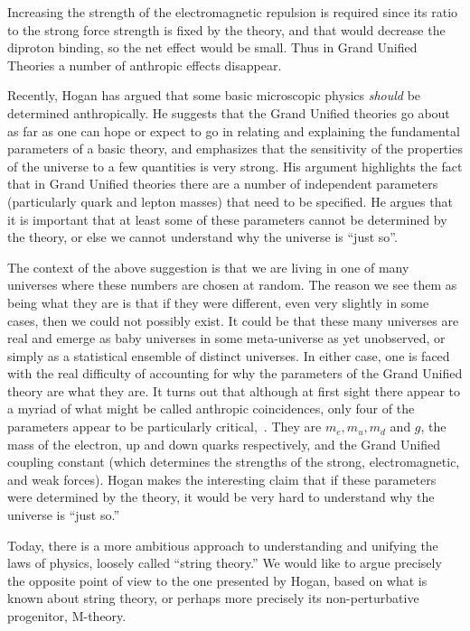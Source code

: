 \documentclass{article}
\begin{document}
Increasing the strength of the electromagnetic
repulsion is required since its ratio to the strong force strength is
fixed by the theory, and that would decrease the diproton binding, so
the net effect would be small. Thus in Grand Unified Theories
a number of anthropic effects disappear.


Recently, Hogan \cite{CH:justso} has argued that some basic microscopic
physics {\it should} be determined anthropically. He suggests that the Grand
Unified theories go about as far as one can hope or expect to go in
relating and explaining the fundamental parameters of a basic theory,
and emphasizes that the sensitivity of the properties of the universe to
a few quantities is very strong. His argument highlights the fact that
in Grand Unified theories there are a number
of independent parameters (particularly quark and lepton masses) that
need to be specified.  He argues that it is important that at least some
of these parameters cannot be determined by the theory, or else we cannot 
understand why the universe is ``just so''.

The context of the above suggestion is that we are living in one of many
universes where these numbers are chosen at random.  The reason we see
them as being what they are is that if they were different, even very
slightly in some cases, then we could not possibly exist. It could be
that these many universes are real and emerge as baby universes in some
meta-universe as yet unobserved, or simply as a statistical ensemble of
distinct universes. In either case, one is faced with the real
difficulty of accounting for why the parameters of the Grand Unified
theory are what they are. It turns out that although at first sight there
appear to a myriad of what might be called anthropic coincidences, 
only four of the parameters appear to be
particularly critical,~\cite{RC:anth}.
They are $m_e, m_u, m_d$ and $g$, the mass of
the electron, up and down quarks respectively, and the Grand Unified
coupling constant (which determines the strengths of the strong,
electromagnetic, and weak forces).  Hogan makes the interesting claim
that if these parameters were determined by the theory, it would be very
hard to understand why the universe is ``just so.''

Today, there is a more ambitious approach to understanding and
unifying the laws of physics, loosely called ``string theory.''
We would like to argue precisely the opposite point of view
to the one presented by Hogan, based on
what is known about string theory, or perhaps more precisely
its non-perturbative progenitor, M-theory.
\end{document}
